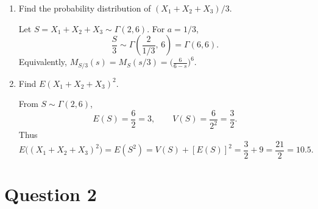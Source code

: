 \documentclass[dvipsnames,11pt]{article}
\begin{document}
\begin{enumerate}[label=\alph*.]
\begin{solution}
            \end{solution}
            
        \item Find the probability distribution of $(X_1+X_2+X_3)/3$.
    
            \begin{solution}
    
                Let $S=X_1+X_2+X_3\sim\Gamma(2,6)$. For $a=1/3$,
                \[
                \frac{S}{3}\sim \Gamma\!\left(\frac{2}{1/3},\,6\right)=\Gamma(6,6).
                \]
                Equivalently, $M_{S/3}(s)=M_S(s/3)=\bigl(\tfrac{6}{6-s}\bigr)^6$.
                
            \end{solution}
            
        \item Find $E(X_1+X_2+X_3)^2$.
    
            \begin{solution}

                From $S\sim\Gamma(2,6)$,
                \[
                E(S)=\frac{6}{2}=3,\qquad V(S)=\frac{6}{2^2}=\frac{3}{2}.
                \]
                Thus
                \[
                E\bigl((X_1+X_2+X_3)^2\bigr)=E(S^2)=V(S)+[E(S)]^2
                =\frac{3}{2}+9=\frac{21}{2}=10.5.
                \]
                
            \end{solution}
            
    \end{enumerate}


\section*{Question 2}
\end{document}
